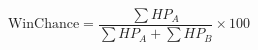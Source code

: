 \documentclass{article}
\begin{document}
\[
  \text{WinChance} = \frac{\sum HP_A}{\sum HP_A + \sum HP_B} \times 100
\]
\pagebreak
\end{document}
